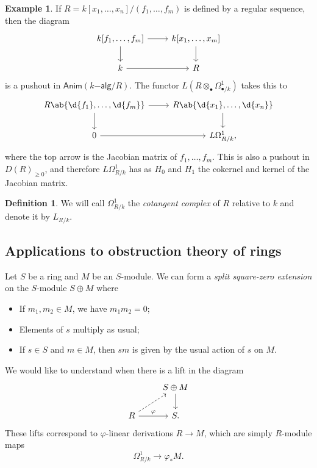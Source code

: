 \documentclass[10pt]{amsart}
\theoremstyle{definition}
\newtheorem{defn}[thm]{Definition}
\newtheorem{exm}[thm]{Example}
\theoremstyle{remark}
\theoremstyle{plain}
\theoremstyle{definition}
\theoremstyle{remark}
\newcommand{\ms}[1]{\mathsf{#1}}
\newcommand{\1}{\mathbf{1}}
\newcommand{\2}{\mathbf{2}}
\newcommand{\3}{\mathbf{3}}
\begin{document}
\begin{exm}
    If $R = k[x_1, \ldots, x_n] / (f_1, \ldots, f_m)$ is defined by a regular sequence, then the diagram
    \begin{equation*}
    \begin{tikzcd}
        k[f_1, \ldots, f_m] \ar{r} \ar{d} & k[x_1, \ldots, x_m] \ar{d} \\
        k \ar{r} & R
    \end{tikzcd}
    \end{equation*}
    is a pushout in $\ms{Anim}(k\ms{-alg}/R)$. The functor $L(R \otimes_{\bullet} \Omega^1_{\bullet/k})$ takes this to
    \begin{equation*}
    \begin{tikzcd}
        R\ab\{\d{f_1}, \ldots, \d{f_m} \}  \ar{r} \ar{d} & R \ab\{ \d{x_1}, \ldots, \d{x_n}\} \ar{d} \\
         0 \ar{r} & L \Omega^1_{R/k},
    \end{tikzcd}
    \end{equation*}
    where the top arrow is the Jacobian matrix of $f_1, \ldots, f_m$. This is also a pushout in $D(R)_{\geq 0}$, and therefore $L\Omega^1_{R/k}$ has as $H_0$ and $H_1$ the cokernel and kernel of the Jacobian matrix.
\end{exm}

\begin{defn}
    We will call $\Omega^1_{R/k}$ the \textit{cotangent complex} of $R$ relative to $k$ and denote it by $L_{R/k}$.
\end{defn}

\subsection{Applications to obstruction theory of rings}%
\label{sub:Applications to obstruction theory of rings}

Let $S$ be a ring and $M$ be an $S$-module. We can form a \textit{split square-zero extension} on the $S$-module $S \oplus M$ where
\begin{itemize}
    \item If $m_1, m_2 \in M$, we have $m_1 m_2 = 0$;
    \item Elements of $s$ multiply as usual;
    \item If $s \in S$ and $m \in M$, then $sm$ is given by the usual action of $s$ on $M$.
\end{itemize}
We would like to understand when there is a lift in the diagram
\begin{equation*}
\begin{tikzcd}
    & S \oplus M \ar{d} \\
    R \ar{r}{\varphi} \ar[dashrightarrow]{ur} & S.
\end{tikzcd}
\end{equation*}
These lifts correspond to $\varphi$-linear derivations $R \to M$, which are simply $R$-module maps
\[ \Omega^1_{R/k} \to \varphi_* M. \]
\end{document}

